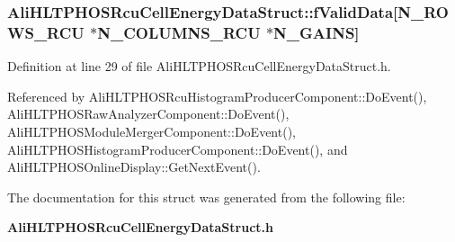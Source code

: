 \subsubsection{ {\bf Ali\-HLTPHOSRcu\-Cell\-Energy\-Data\-Struct::f\-Valid\-Data}[N\_\-ROWS\_\-RCU $\ast$N\_\-COLUMNS\_\-RCU $\ast$N\_\-GAINS]}\label{structAliHLTPHOSRcuCellEnergyDataStruct_o4}




Definition at line 29 of file Ali\-HLTPHOSRcu\-Cell\-Energy\-Data\-Struct.h.

Referenced by Ali\-HLTPHOSRcu\-Histogram\-Producer\-Component::Do\-Event(), Ali\-HLTPHOSRaw\-Analyzer\-Component::Do\-Event(), Ali\-HLTPHOSModule\-Merger\-Component::Do\-Event(), Ali\-HLTPHOSHistogram\-Producer\-Component::Do\-Event(), and Ali\-HLTPHOSOnline\-Display::Get\-Next\-Event().

The documentation for this struct was generated from the following file:\begin{CompactItemize}
\item 
{\bf Ali\-HLTPHOSRcu\-Cell\-Energy\-Data\-Struct.h}\end{CompactItemize}
